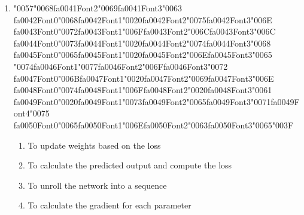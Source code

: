 \documentclass[12pt]{article}
\begin{document}
\begin{enumerate}[label=Q\arabic*.]
\begin{enumerate}[label=(\Alph*)]
    \item They assume fixed input size and struggle with temporal order
    \item They cannot be trained with gradient descent
    \item They do not use activation functions
\end{enumerate}
\item {\char"0057}{\char"0068}{\csname fa0041Font2\endcsname\char"0069}{\csname fa0041Font3\endcsname\char"0063} {\csname fa0042Font0\endcsname\char"0068}{\csname fa0042Font1\endcsname\char"0020}{\csname fa0042Font2\endcsname\char"0075}{\csname fa0042Font3\endcsname\char"006E} {\csname fa0043Font0\endcsname\char"0072}{\csname fa0043Font1\endcsname\char"006F}{\csname fa0043Font2\endcsname\char"006C}{\csname fa0043Font3\endcsname\char"006C} {\csname fa0044Font0\endcsname\char"0073}{\csname fa0044Font1\endcsname\char"0020}{\csname fa0044Font2\endcsname\char"0074}{\csname fa0044Font3\endcsname\char"0068} {\csname fa0045Font0\endcsname\char"0065}{\csname fa0045Font1\endcsname\char"0020}{\csname fa0045Font2\endcsname\char"006E}{\csname fa0045Font3\endcsname\char"0065} {\char"0074}{\csname fa0046Font1\endcsname\char"0077}{\csname fa0046Font2\endcsname\char"006F}{\csname fa0046Font3\endcsname\char"0072} {\csname fa0047Font0\endcsname\char"006B}{\csname fa0047Font1\endcsname\char"0020}{\csname fa0047Font2\endcsname\char"0069}{\csname fa0047Font3\endcsname\char"006E} {\csname fa0048Font0\endcsname\char"0074}{\csname fa0048Font1\endcsname\char"006F}{\csname fa0048Font2\endcsname\char"0020}{\csname fa0048Font3\endcsname\char"0061} {\csname fa0049Font0\endcsname\char"0020}{\csname fa0049Font1\endcsname\char"0073}{\csname fa0049Font2\endcsname\char"0065}{\csname fa0049Font3\endcsname\char"0071}{\csname fa0049Font4\endcsname\char"0075} {\csname fa0050Font0\endcsname\char"0065}{\csname fa0050Font1\endcsname\char"006E}{\csname fa0050Font2\endcsname\char"0063}{\csname fa0050Font3\endcsname\char"0065}{\char"003F}
\begin{enumerate}[label=(\Alph*)]
    \item To update weights based on the loss
    \item To calculate the predicted output and compute the loss
    \item To unroll the network into a sequence
    \item To calculate the gradient for each parameter
\end{enumerate}

\end{enumerate}
\end{document}

